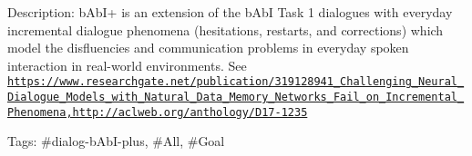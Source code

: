Description\+: b\+Ab\+I+ is an extension of the b\+AbI Task 1 dialogues with everyday incremental dialogue phenomena (hesitations, restarts, and corrections) which model the disfluencies and communication problems in everyday spoken interaction in real-\/world environments. See \href{https://www.researchgate.net/publication/319128941_Challenging_Neural_Dialogue_Models_with_Natural_Data_Memory_Networks_Fail_on_Incremental_Phenomena,http://aclweb.org/anthology/D17-1235}{\tt https\+://www.\+researchgate.\+net/publication/319128941\+\_\+\+Challenging\+\_\+\+Neural\+\_\+\+Dialogue\+\_\+\+Models\+\_\+with\+\_\+\+Natural\+\_\+\+Data\+\_\+\+Memory\+\_\+\+Networks\+\_\+\+Fail\+\_\+on\+\_\+\+Incremental\+\_\+\+Phenomena,http\+://aclweb.\+org/anthology/\+D17-\/1235}

Tags\+: \#dialog-\/b\+Ab\+I-\/plus, \#\+All, \#\+Goal 